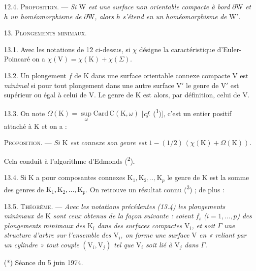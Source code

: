 12.4. \textsc{Proposition.} --- \textit{Si \(\mathrm{W}\) est une surface \textup{non orientable} compacte à bord \(\partial\mathrm{W}\) et \(h\) un homéomorphisme de \(\partial\mathrm{W}\), alors \(h\) s'étend en un homéomorphisme de \(\mathrm{W}'\).}

13. \textsc{Plongements minimaux.}

13.1. Avec les notations de 12 ci-dessus, si \(\chi\) désigne la caractéristique d'Euler-Poincaré on a \(\chi(\mathrm{V})=\chi(\mathrm{K})+\chi(\Sigma)\).

13.2. Un plongement \(f\) de \(\mathrm{K}\) dans une surface orientable connexe compacte \(\mathrm{V}\) est \textit{minimal} si pour tout plongement dans une autre surface \(\mathrm{V}'\) le genre de \(\mathrm{V}'\) est supérieur ou égal à celui de \(\mathrm{V}\). Le genre de \(\mathrm{K}\) est alors, par définition, celui de \(\mathrm{V}\).

13.3. On note \(\Omega(\mathrm{K})=\sup\limits_\omega\mathrm{Card}\,\mathrm{C}(\mathrm{K},\omega)\) [\textit{cf.} (\textsuperscript{1})], c'est un entier positif attaché à \(\mathrm{K}\) et on a :

\textsc{Proposition.} --- \textit{Si \(\mathrm{K}\) est connexe son genre est \(1-(1/2)\,(\chi(\mathrm{K})+\Omega(\mathrm{K}))\).}

Cela conduit à l'algorithme d'Edmonds (\textsuperscript{2}).

13.4. Si \(\mathrm{K}\) a pour composantes connexes \(\mathrm{K}_1,\mathrm{K}_2,..,\mathrm{K}_p\) le genre de \(\mathrm{K}\) est la somme des genres de \(\mathrm{K}_1,\mathrm{K}_2,\ldots,\mathrm{K}_p\). On retrouve un résultat connu (\textsuperscript{3}) ; de plus :

13.5. \textsc{Théorème.} --- \textit{Avec les notations précédentes \textup{(13.4)} les plongements minimaux de \(\mathrm{K}\) sont ceux obtenus de la façon suivante : soient \(f_i\) (\(i=1,\ldots,p\)) des plongements minimaux des \(\mathrm{K}_i\) dans des surfaces compactes \(\mathrm{V}_i\), et soit \(\Gamma\) une structure d'arbre sur l'ensemble des \(\mathrm{V}_i\), on forme une surface \(\mathrm{V}\) en « reliant par un cylindre » tout couple \((\mathrm{V}_i,\mathrm{V}_j)\) tel que \(\mathrm{V}_i\) soit lié à \(\mathrm{V}_j\) dans \(\Gamma\).}

{\small (*) Séance du 5 juin 1974.}

